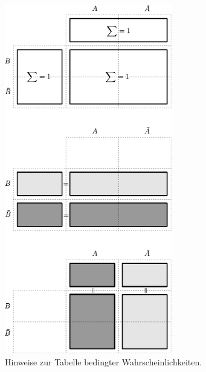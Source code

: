 \newpage
\begin{figure}[h!]
	\centering
	\includegraphics[width=0.65\textwidth]{bedingte-wahrscheinlichkeit-tipps.pdf}
	\caption{Hinweise zur Tabelle bedingter Wahrscheinlichkeiten.}
\end{figure}
